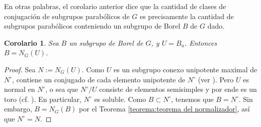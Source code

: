 \documentclass[spanish,10pt]{amsart}
\newtheorem{corollary}[theorem]{Corolario}
\theoremstyle{definition}
\theoremstyle{remark}
\numberwithin{equation}{section}
\begin{document}
En otras palabras, el corolario anterior dice que la cantidad de clases de conjugación de subgrupos parabólicos de $G$ es precisamente la cantidad de subgrupos parabólicos conteniendo un subgrupo de Borel $B$ de $G$ dado.

\begin{corollary}
Sea $B$ un subgrupo de Borel de $G$, y $U = B_u$. Entonces $B = N_G (U)$.
\end{corollary}
\begin{proof}
Sea $N := N_G (U)$. Como $U$ es un subgrupo conexo unipotente maximal de $N^\circ$, contiene un conjugado de cada elemento unipotente de $N^\circ$ (ver \cite[Teorema 22.2]{humphreys2012linearAlgebraicGroups}). Pero $U$ es normal en $N^\circ$, o sea que $N^\circ / U$ consiste de elementos semisimples y por ende es un toro (cf. \cite[Ejercicio 21.2]{humphreys2012linearAlgebraicGroups}). En particular, $N^\circ$ es soluble. Como $B \subset N^\circ$, tenemos que $B = N^\circ$. Sin embargo, $B = N_G (B)$ por el Teorema \ref{teorema:teorema del normalizador}, así que $N^\circ = N$.
\end{proof}


















\end{document}
